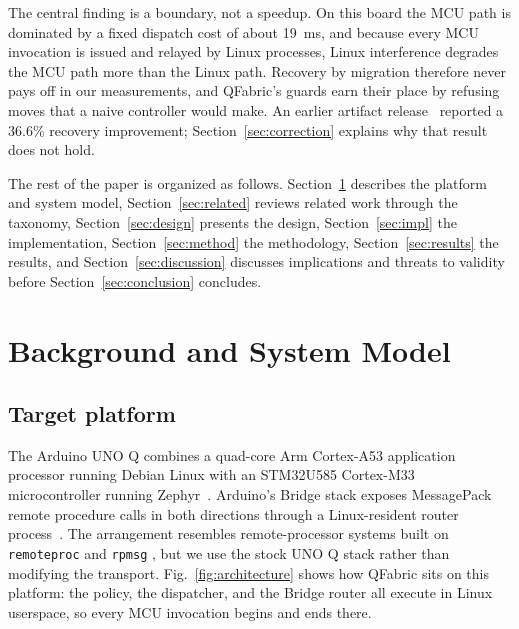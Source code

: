 \documentclass[conference]{IEEEtran}
\newcommand{\system}{QFabric\xspace}
\begin{document}
The central finding is a boundary, not a speedup. On this board the MCU path
is dominated by a fixed dispatch cost of about 19~ms, and because every MCU
invocation is issued and relayed by Linux processes, Linux interference
degrades the MCU path more than the Linux path. Recovery by migration
therefore never pays off in our measurements, and \system's guards earn their
place by refusing moves that a naive controller would make. An earlier
artifact release~\cite{qfabric2026v101} reported a 36.6\% recovery
improvement; Section~\ref{sec:correction} explains why that result does not
hold.

The rest of the paper is organized as follows.
Section~\ref{sec:background} describes the platform and system model,
Section~\ref{sec:related} reviews related work through the taxonomy,
Section~\ref{sec:design} presents the design, Section~\ref{sec:impl} the
implementation, Section~\ref{sec:method} the methodology,
Section~\ref{sec:results} the results, and Section~\ref{sec:discussion}
discusses implications and threats to validity before
Section~\ref{sec:conclusion} concludes.

\section{Background and System Model}
\label{sec:background}
\subsection{Target platform}
The Arduino UNO Q combines a quad-core Arm Cortex-A53 application processor
running Debian Linux with an STM32U585 Cortex-M33 microcontroller running
Zephyr~\cite{arduinoUnoQ}. Arduino's Bridge stack exposes MessagePack remote
procedure calls in both directions through a Linux-resident router
process~\cite{arduinoRouterBridge}. The arrangement resembles
remote-processor systems built on \texttt{remoteproc} and \texttt{rpmsg}
\cite{linuxRemoteproc,linuxRpmsg}, but we use the stock UNO Q stack rather
than modifying the transport. Fig.~\ref{fig:architecture} shows how \system
sits on this platform: the policy, the dispatcher, and the Bridge router all
execute in Linux userspace, so every MCU invocation begins and ends there.
\end{document}

